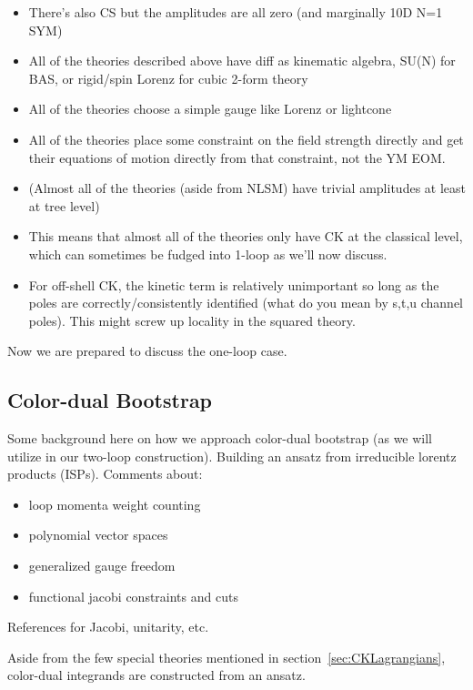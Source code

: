 \documentclass[11pt,letter]{article}
\def\sect#1{section~\ref{#1}}
\begin{document}
\begin{itemize}
\item There's also CS but the amplitudes are all zero (and marginally 10D N=1 SYM)
\item All of the theories described above have diff as kinematic algebra, SU(N) for BAS, or rigid/spin Lorenz for cubic 2-form theory
\item All of the theories choose a simple gauge like Lorenz or lightcone
\item All of the theories place some constraint on the field strength directly and get their equations of motion directly from that constraint, not the YM EOM.
\item (Almost all of the theories (aside from NLSM) have trivial amplitudes at least at tree level)
\item This means that almost all of the theories only have CK at the classical level, which can sometimes be fudged into 1-loop as we'll now discuss.
\item For off-shell CK, the kinetic term is relatively unimportant so long as the poles are correctly/consistently identified (what do you mean by s,t,u channel poles).  This might screw up locality in the squared theory.
\end{itemize}

Now we are prepared to discuss the one-loop case. 

\subsection{Color-dual Bootstrap}
Some background here on how we approach color-dual bootstrap (as we will utilize in our two-loop construction). Building an ansatz from irreducible lorentz products (ISPs). Comments about:
\begin{itemize}
\item loop momenta weight counting 
\item polynomial vector spaces 
\item generalized gauge freedom
\item functional jacobi constraints and cuts
\end{itemize} 

References for Jacobi, unitarity, etc.

Aside from the few special theories mentioned in \sect{sec:CKLagrangians}, color-dual integrands are constructed from an ansatz.
\end{document}
